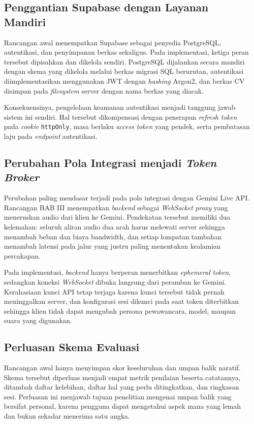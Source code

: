 \documentclass[12pt,a4paper,oneside]{report}
\begin{document}
\subsection{Penggantian Supabase dengan Layanan Mandiri}

Rancangan awal menempatkan Supabase sebagai penyedia PostgreSQL, autentikasi,
dan penyimpanan berkas sekaligus. Pada implementasi, ketiga peran tersebut
dipisahkan dan dikelola sendiri. PostgreSQL dijalankan secara mandiri dengan
skema yang dikelola melalui berkas migrasi SQL berurutan, autentikasi
diimplementasikan menggunakan JWT dengan \textit{hashing} Argon2, dan berkas
CV disimpan pada \textit{filesystem} server dengan nama berkas yang diacak.

Konsekuensinya, pengelolaan keamanan autentikasi menjadi tanggung jawab
sistem ini sendiri. Hal tersebut dikompensasi dengan penerapan \textit{refresh
token} pada \textit{cookie} \texttt{httpOnly}, masa berlaku \textit{access
token} yang pendek, serta pembatasan laju pada \textit{endpoint}
autentikasi.

\subsection{Perubahan Pola Integrasi menjadi \textit{Token Broker}}

Perubahan paling mendasar terjadi pada pola integrasi dengan Gemini Live API.
Rancangan BAB III menempatkan \textit{backend} sebagai \textit{WebSocket
proxy} yang meneruskan audio dari klien ke Gemini. Pendekatan tersebut
memiliki dua kelemahan: seluruh aliran audio dua arah harus melewati server
sehingga menambah beban dan biaya bandwidth, dan setiap lompatan tambahan
menambah latensi pada jalur yang justru paling menentukan kealamian
percakapan.

Pada implementasi, \textit{backend} hanya berperan menerbitkan
\textit{ephemeral token}, sedangkan koneksi \textit{WebSocket} dibuka langsung
dari peramban ke Gemini. Kerahasiaan kunci API tetap terjaga karena kunci
tersebut tidak pernah meninggalkan server, dan konfigurasi sesi dikunci pada
saat token diterbitkan sehingga klien tidak dapat mengubah persona
pewawancara, model, maupun suara yang digunakan.

\subsection{Perluasan Skema Evaluasi}

Rancangan awal hanya menyimpan skor keseluruhan dan umpan balik naratif.
Skema tersebut diperluas menjadi empat metrik penilaian beserta catatannya,
ditambah daftar kelebihan, daftar hal yang perlu ditingkatkan, dan ringkasan
sesi. Perluasan ini menjawab tujuan penelitian mengenai umpan balik yang
bersifat personal, karena pengguna dapat mengetahui aspek mana yang lemah dan
bukan sekadar menerima satu angka.
\end{document}
